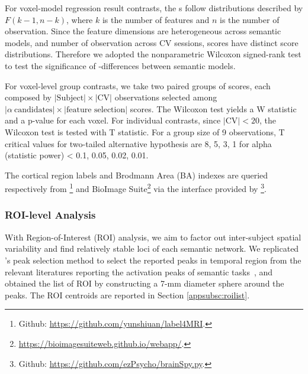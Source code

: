 For voxel-model regression result contrasts, the s follow distributions described by \(F(k-1, n-k)\), where \(k\) is the number of features and \(n\) is the number of observation. Since the feature dimensions are heterogeneous across semantic models, and number of observation across CV sessions,  scores have distinct score distributions. Therefore we adopted the nonparametric Wilcoxon signed-rank test to test the significance of -differences between semantic models. 

For voxel-level group contrasts, we take two paired groups of  scores, each composed by \( \lvert \text{Subject} \rvert \times \lvert \text{CV} \rvert \) observations selected among \( \lvert \alpha~\text{candidates} \rvert \times \lvert \text{feature selection} \rvert \) scores. The Wilcoxon test yields a W statistic and a p-value for each voxel. For individual contrasts, since \(\lvert \text{CV} \rvert < 20\), the Wilcoxon test is tested with T statistic. For a group size of 9 observations, T critical values for two-tailed alternative hypothesis are 8, 5, 3, 1 for alpha (statistic power) < 0.1, 0.05, 0.02, 0.01.

The cortical region labels and Brodmann Area (BA) indexes are queried respectively from \footnote{Github: \url{https://github.com/yunshiuan/label4MRI}.} and BioImage Suite\footnote{\url{https://bioimagesuiteweb.github.io/webapp/}.} via the interface provided by \footnote{Github: \url{https://github.com/ezPsycho/brainSpy.py}.}.

\subsubsection{ROI-level Analysis}

With Region-of-Interest (ROI) analysis, we aim to factor out inter-subject spatial variability and find relatively stable loci of each semantic network. We replicated \textcite{pattersonWhereYouKnow2007}'s peak selection method to select the reported peaks in temporal region from the relevant literatures reporting the activation peaks of semantic tasks~\parencite{devlinSusceptibilityInducedLossSignal2000, mummerycatherinej.GeneratingTigerAnimal1996, priceMetaanalysesObjectNaming2005, rogersAnteriorTemporalCortex2006, brightUnitaryVsMultiple2004, crinionTemporalLobeRegions2003, scottIdentificationPathwayIntelligible2000, gorno-tempiniIdentificationFamousFaces2001, nakamuraFunctionalDelineationHuman2000, gorno-tempiniNeuralSystemsSustaining1998, tsukiuraDissociableRolesBilateral2006, nakamuraNeuralSubstratesRecognition2001, binderHumanTemporalLobe2000,davisHierarchicalProcessingSpoken2003, scottNeuralCorrelatesIntelligibility2006, ferstlEmotionalTemporalAspects2005, noppeneyRetrievalVisualAuditory2002, papathanassiouCommonLanguageNetwork2000, tranelNamingSameEntities2005, mummeryDualProcessModelSemantic1999, smallRoleRightAnterior1997, simonsNeuralMechanismsVisual2003, vuilleumierMultipleLevelsVisual2002, grossmanNeuralBasisSemantic2003},
and obtained the list of ROI by constructing a 7-mm diameter sphere around the peaks. The ROI centroids are reported in Section \ref{appsubsc:roilist}.

